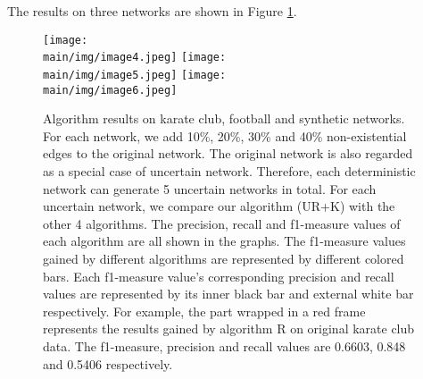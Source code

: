 \documentclass[\main/thesis.tex]{subfiles}
\begin{document}


The results on three networks are shown in Figure \ref{supervised-result-local}.

\begin{figure}
\texttt{[image: \\main/img/image4.jpeg]}
\centering
\texttt{[image: \\main/img/image5.jpeg]}
\centering
\texttt{[image: \\main/img/image6.jpeg]}
\caption{Algorithm results on karate club, football and synthetic networks. For each network, we add 10\%, 20\%, 30\% and 40\% non-existential edges to the original network. The original network is also regarded as a special case of uncertain network. Therefore, each deterministic network can generate 5 uncertain networks in total. For each uncertain network, we compare our algorithm (UR+K) with the other 4 algorithms. The precision, recall and f1-measure values of each algorithm are all shown in the graphs. The f1-measure values gained by different algorithms are represented by different colored bars. Each f1-measure value's corresponding precision and recall values are represented by its inner black bar and external white bar respectively. For example, the part wrapped in a red frame represents the results gained by algorithm R on original karate club data. The f1-measure, precision and recall values are 0.6603, 0.848 and 0.5406 respectively.}
\label{supervised-result-local}
\end{figure}

\end{document}
